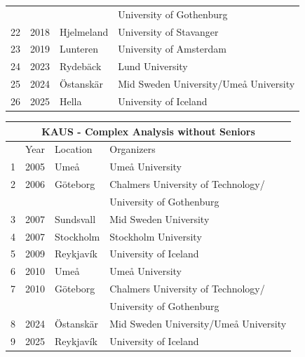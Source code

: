 \documentclass[12pt,openany]{report}      %
\begin{document}
\begin{tabular}{llll}
       &      &               & University of Gothenburg\\
    22 & 2018 & Hjelmeland & University of Stavanger\\
    23 & 2019 & Lunteren & University of Amsterdam\\
    24 & 2023 & Rydebäck & Lund University\\
    25 & 2024 & Östanskär & Mid Sweden University/Umeå University\\
    26 & 2025 & Hella & University of Iceland\\
    \bottomrule
    \end{tabular}
    
\begin{tabular}{llll}
        \toprule
        \multicolumn{4}{c}{KAUS - Complex Analysis without Seniors}\\
        \midrule
         & Year & Location & Organizers \\
         \midrule
        1 & 2005 & Umeå & Umeå University\\
        2 & 2006 & Göteborg  & Chalmers University of Technology/\\
          &      &               & University of Gothenburg \\
        3 & 2007 & Sundsvall & Mid Sweden University\\
        4 & 2007 & Stockholm & Stockholm University  \\
        5 & 2009 & Reykjavík & University of Iceland\\
        6 & 2010 & Umeå & Umeå University\\
        7 & 2010 & Göteborg & Chalmers University of Technology/\\
           &      &               & University of Gothenburg\\
        8 & 2024 & Östanskär & Mid Sweden University/Umeå University\\
        9 & 2025 & Reykjavík & University of Iceland\\
        \bottomrule
        \end{tabular}
\end{document}
